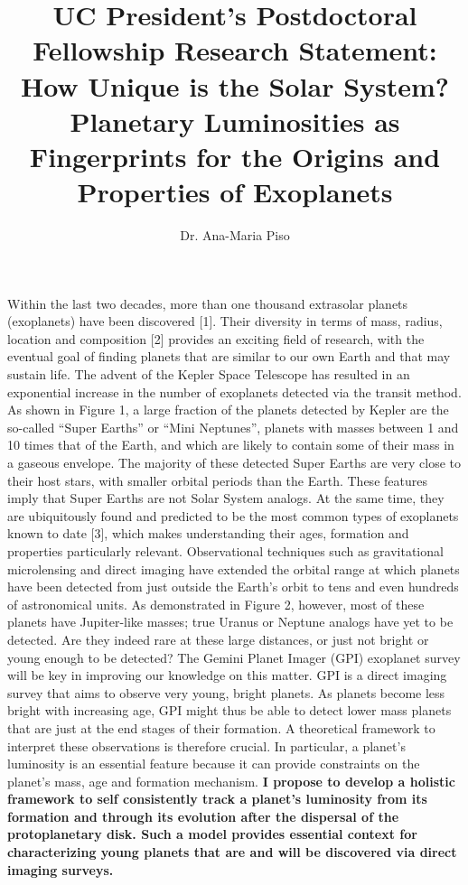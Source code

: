 \documentclass[12pt, letterpaper]{article}
\date{}
\title{\Large UC President's Postdoctoral Fellowship Research Statement: \\
\textbf{How Unique is the Solar System? Planetary Luminosities as Fingerprints for the Origins and Properties of Exoplanets}}
\author{Dr. Ana-Maria Piso}
\begin{document}
\maketitle


\vspace{-0.9cm}


Within the last two decades, more than one thousand extrasolar planets (exoplanets) have been discovered [1]. Their diversity in terms of mass, radius, location and composition [2] provides an exciting field of research, with the eventual goal of finding planets that are similar to our own Earth and that may sustain life. The advent of the Kepler Space Telescope has resulted in an exponential increase in the number of exoplanets detected via the transit method. As shown in Figure 1, a large fraction of the planets detected by Kepler are the so-called ``Super Earths'' or ``Mini Neptunes'', planets with masses between 1 and 10 times that of the Earth, and which are likely to contain some of their mass in a gaseous envelope. The majority of these detected Super Earths are very close to their host stars, with smaller orbital periods than the Earth. These features imply that Super Earths are not Solar System analogs. At the same time, they are ubiquitously found and predicted to be the most common types of exoplanets known to date [3], which makes understanding their ages, formation and properties particularly relevant. Observational techniques such as gravitational microlensing and direct imaging have extended the orbital range at which planets have been detected from just outside the Earth's orbit to tens and even hundreds of astronomical units. As demonstrated in Figure 2, however, most of these planets have Jupiter-like masses; true Uranus or Neptune analogs have yet to be detected. Are they indeed rare at these large distances, or just not bright or young enough to be detected? The Gemini Planet Imager (GPI) exoplanet survey will be key in improving our knowledge on this matter. GPI is a direct imaging survey that aims to observe very young, bright planets. As planets become less bright with increasing age, GPI might thus be able to detect lower mass planets that are just at the end stages of their formation. A theoretical framework to interpret these observations is therefore crucial. In particular, a planet's luminosity is an essential feature because it can provide constraints on the planet's mass, age and formation mechanism. \textbf{I propose to develop a holistic framework to self consistently track a planet's luminosity from its formation and through its evolution after the dispersal of the protoplanetary disk. Such a model provides essential context for characterizing young planets that are and will be discovered via direct imaging surveys.}
\end{document}
